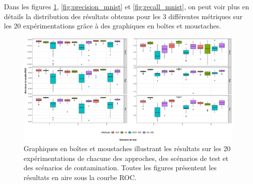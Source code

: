 Dans les figures \ref{fig:auc_mnist}, \ref{fig:precision_mnist} et \ref{fig:recall_mnist}, on peut voir plus en détails la distribution des résultats obtenus pour les 3 différentes métriques sur les 20 expérimentations grâce à des graphiques en boîtes et moustaches.

\begin{figure}[H]
	\centering
	\includegraphics[width=\linewidth]{images/images_boxplots/auc_mnist.pdf}
	\caption{Graphiques en boîtes et moustaches illustrant les résultats sur les 20 expérimentations de chacune des approches, des scénarios de test et des scénarios de contamination. Toutes les figures présentent les résultats en aire sous la courbe ROC.}
	\label{fig:auc_mnist}
\end{figure}

